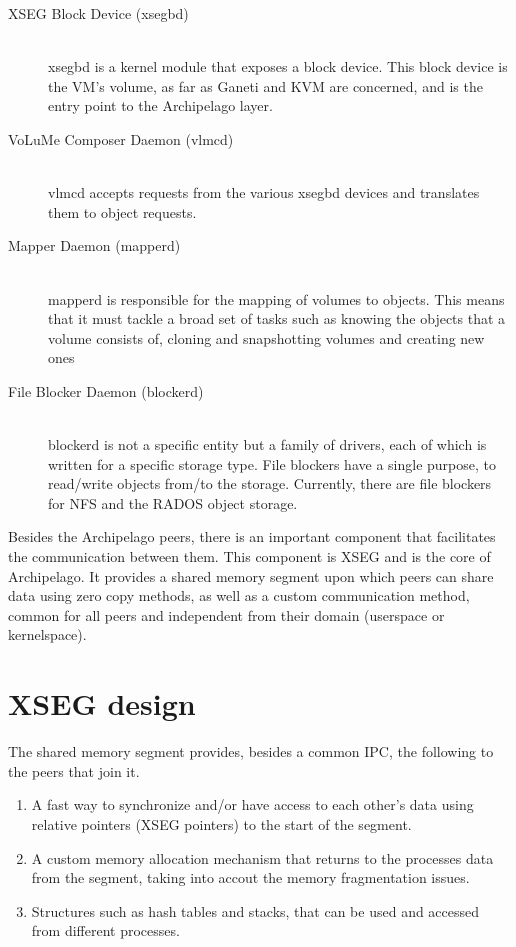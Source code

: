 \begin{description}
	\item[XSEG Block Device (xsegbd)] \hfill \\
		xsegbd is a kernel module that exposes a block device.  This block 
		device is the VM's volume, as far as Ganeti and KVM are concerned, and 
		is the entry point to the Archipelago layer.
	\item[VoLuMe Composer Daemon (vlmcd)] \hfill \\
		vlmcd accepts requests from the various xsegbd devices and translates 
		them to object requests.
	\item[Mapper Daemon (mapperd)] \hfill \\
		mapperd is responsible for the mapping of volumes to objects. This 
		means that it must tackle a broad set of tasks such as knowing the 
		objects that a volume consists of, cloning and snapshotting volumes and 
		creating new ones
	\item[File Blocker Daemon (blockerd)] \hfill \\
		blockerd is not a specific entity but a family of drivers, each of 
		which is written for a specific storage type. File blockers have a 
		single purpose, to read/write objects from/to the storage. Currently, 
		there are file blockers for NFS and the RADOS object storage.
\end{description}
	
Besides the Archipelago peers, there is an important component that facilitates 
the communication between them. This component is XSEG and is the core of 
Archipelago. It provides a shared memory segment upon which peers can share 
data using zero copy methods, as well as a custom communication method, common 
for all peers and independent from their domain (userspace or kernelspace).

\section{XSEG design}

The shared memory segment provides, besides a common IPC, the following to the 
peers that join it.

\begin{enumerate}
	\item A fast way to synchronize and/or have access to each other's data 
		using relative pointers (XSEG pointers) to the start of the segment.
	\item A custom memory allocation mechanism that returns to the processes 
		data from the segment, taking into accout the memory fragmentation 
		issues.
	\item Structures such as hash tables and stacks, that can be used and 
		accessed from different processes.
\end{enumerate}

